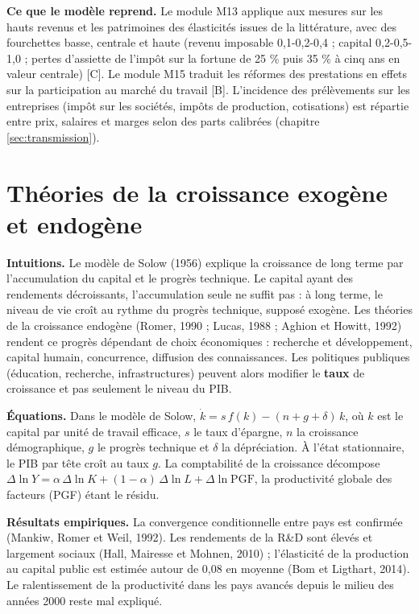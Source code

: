 \documentclass[
  11pt,
  11pt,
  a4paper,
  openany]{book}
\begin{document}
\textbf{Ce que le modèle reprend.} Le module M13 applique aux mesures
sur les hauts revenus et les patrimoines des élasticités issues de la
littérature, avec des fourchettes basse, centrale et haute (revenu
imposable 0,1-0,2-0,4 ; capital 0,2-0,5-1,0 ; pertes d'assiette de
l'impôt sur la fortune de 25 \% puis 35 \% à cinq ans en valeur
centrale) {[}C{]}. Le module M15 traduit les réformes des prestations en
effets sur la participation au marché du travail {[}B{]}. L'incidence
des prélèvements sur les entreprises (impôt sur les sociétés, impôts de
production, cotisations) est répartie entre prix, salaires et marges
selon des parts calibrées (chapitre \ref{sec:transmission}).

\hypertarget{sec:croissance}{%
\section{Théories de la croissance exogène et
endogène}\label{sec:croissance}}

\textbf{Intuitions.} Le modèle de Solow (1956) explique la croissance de
long terme par l'accumulation du capital et le progrès technique. Le
capital ayant des rendements décroissants, l'accumulation seule ne
suffit pas : à long terme, le niveau de vie croît au rythme du progrès
technique, supposé exogène. Les théories de la croissance endogène
(Romer, 1990 ; Lucas, 1988 ; Aghion et Howitt, 1992) rendent ce progrès
dépendant de choix économiques : recherche et développement, capital
humain, concurrence, diffusion des connaissances. Les politiques
publiques (éducation, recherche, infrastructures) peuvent alors modifier
le \textbf{taux} de croissance et pas seulement le niveau du PIB.

\textbf{Équations.} Dans le modèle de Solow,
\(\dot k = s\,f(k) - (n + g + \delta)\,k\), où \(k\) est le capital par
unité de travail efficace, \(s\) le taux d'épargne, \(n\) la croissance
démographique, \(g\) le progrès technique et \(\delta\) la dépréciation.
À l'état stationnaire, le PIB par tête croît au taux \(g\). La
comptabilité de la croissance décompose
\(\Delta \ln Y = \alpha\,\Delta \ln K + (1-\alpha)\,\Delta \ln L + \Delta \ln \text{PGF}\),
la productivité globale des facteurs (PGF) étant le résidu.

\textbf{Résultats empiriques.} La convergence conditionnelle entre pays
est confirmée (Mankiw, Romer et Weil, 1992). Les rendements de la R\&D
sont élevés et largement sociaux (Hall, Mairesse et Mohnen, 2010) ;
l'élasticité de la production au capital public est estimée autour de
0,08 en moyenne (Bom et Ligthart, 2014). Le ralentissement de la
productivité dans les pays avancés depuis le milieu des années 2000
reste mal expliqué.
\end{document}
